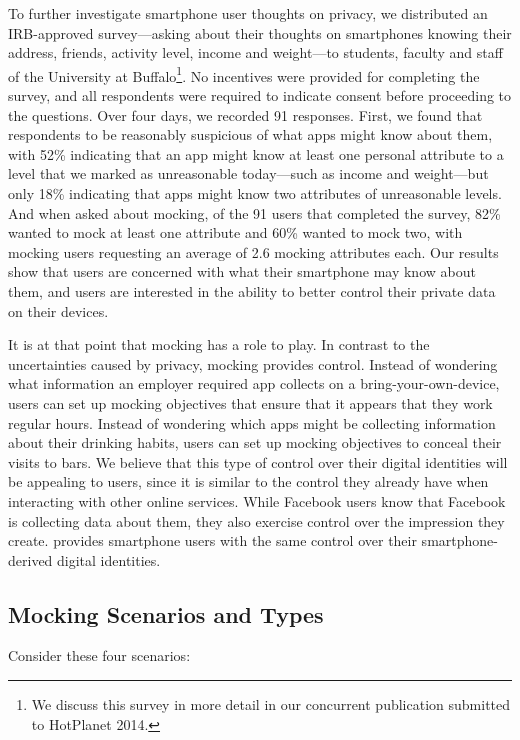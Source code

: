To further investigate smartphone user thoughts on privacy, we distributed an
IRB-approved survey---asking about their thoughts on smartphones knowing their
address, friends, activity level, income and weight---to students, faculty and
staff of the University at Buffalo\footnote{We discuss this survey in more
detail in our concurrent publication submitted to HotPlanet 2014.}. No
incentives were provided for completing  the  survey,  and all  respondents
were  required to indicate consent before proceeding to the questions.  Over
four days, we recorded 91 responses. First,  we  found  that respondents  to be
reasonably suspicious of what apps might know about them, with 52\% indicating
that  an app  might  know  at  least  one personal attribute  to a  level  that
we marked  as  unreasonable  today---such as income and weight---but  only 18\%
indicating that  apps might know two attributes of unreasonable levels.  And
when asked about mocking,  of the 91 users that  completed  the  survey, 82\%
wanted  to mock  at least one attribute and 60\% wanted to mock two, with
mocking users requesting an average of 2.6 mocking attributes each. Our results
show that users are concerned with what their smartphone may know about them,
and users are interested in the ability to better control their private data on
their devices.

It is at that point that mocking has a role to play. In contrast to the
uncertainties caused by privacy, mocking provides control. Instead of
wondering what information an employer required app collects on a
bring-your-own-device, users can set up mocking objectives that
ensure that it appears that they work regular hours. Instead of wondering
which apps might be collecting information about their drinking habits, users
can set up mocking objectives to conceal their visits to bars. We believe
that this type of control over their digital identities will be appealing
to users, since it is similar to the control they already have when
interacting with other online services. While Facebook users know that
Facebook is collecting data about them, they also exercise control over the
impression they create. \PocketMocker{} provides smartphone users with the
same control over their smartphone-derived digital identities.


\subsection{Mocking Scenarios and Types}

Consider these four scenarios:

